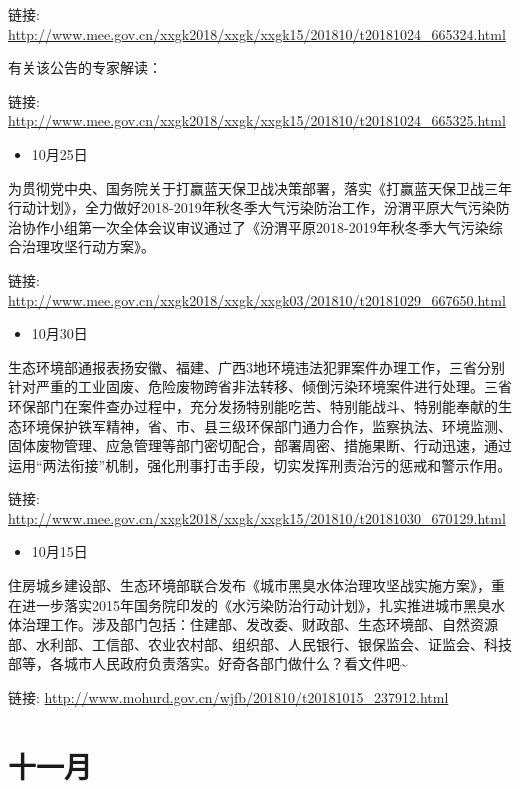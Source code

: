 \documentclass[
]{book}
\providecommand{\tightlist}{%
  \setlength{\itemsep}{0pt}\setlength{\parskip}{0pt}}
\begin{document}
链接: \url{http://www.mee.gov.cn/xxgk2018/xxgk/xxgk15/201810/t20181024_665324.html}

有关该公告的专家解读：

链接: \url{http://www.mee.gov.cn/xxgk2018/xxgk/xxgk15/201810/t20181024_665325.html}

\begin{itemize}
\tightlist
\item
  10月25日
\end{itemize}

为贯彻党中央、国务院关于打赢蓝天保卫战决策部署，落实《打赢蓝天保卫战三年行动计划》，全力做好2018-2019年秋冬季大气污染防治工作，汾渭平原大气污染防治协作小组第一次全体会议审议通过了《汾渭平原2018-2019年秋冬季大气污染综合治理攻坚行动方案》。

链接: \url{http://www.mee.gov.cn/xxgk2018/xxgk/xxgk03/201810/t20181029_667650.html}

\begin{itemize}
\tightlist
\item
  10月30日
\end{itemize}

生态环境部通报表扬安徽、福建、广西3地环境违法犯罪案件办理工作，三省分别针对严重的工业固废、危险废物跨省非法转移、倾倒污染环境案件进行处理。三省环保部门在案件查办过程中，充分发扬特别能吃苦、特别能战斗、特别能奉献的生态环境保护铁军精神，省、市、县三级环保部门通力合作，监察执法、环境监测、固体废物管理、应急管理等部门密切配合，部署周密、措施果断、行动迅速，通过运用``两法衔接''机制，强化刑事打击手段，切实发挥刑责治污的惩戒和警示作用。

链接: \url{http://www.mee.gov.cn/xxgk2018/xxgk/xxgk15/201810/t20181030_670129.html}

\begin{itemize}
\tightlist
\item
  10月15日
\end{itemize}

住房城乡建设部、生态环境部联合发布《城市黑臭水体治理攻坚战实施方案》，重在进一步落实2015年国务院印发的《水污染防治行动计划》，扎实推进城市黑臭水体治理工作。涉及部门包括：住建部、发改委、财政部、生态环境部、自然资源部、水利部、工信部、农业农村部、组织部、人民银行、银保监会、证监会、科技部等，各城市人民政府负责落实。好奇各部门做什么？看文件吧\textasciitilde{}

链接: \url{http://www.mohurd.gov.cn/wjfb/201810/t20181015_237912.html}

\hypertarget{ux5341ux4e00ux6708-1}{%
\section*{十一月}\label{ux5341ux4e00ux6708-1}}
\end{document}
